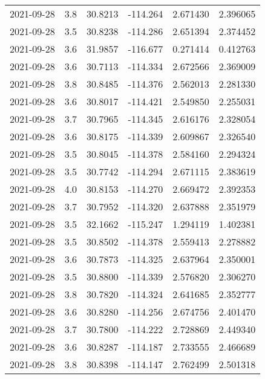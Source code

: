 \begin{tabular}{lrrrrr}
2021-09-28 &       3.8 &  30.8213 &  -114.264 &         2.671430 &         2.396065 \\
2021-09-28 &       3.5 &  30.8238 &  -114.286 &         2.651394 &         2.374452 \\
2021-09-28 &       3.6 &  31.9857 &  -116.677 &         0.271414 &         0.412763 \\
2021-09-28 &       3.6 &  30.7113 &  -114.334 &         2.672566 &         2.369009 \\
2021-09-28 &       3.8 &  30.8485 &  -114.376 &         2.562013 &         2.281330 \\
2021-09-28 &       3.6 &  30.8017 &  -114.421 &         2.549850 &         2.255031 \\
2021-09-28 &       3.7 &  30.7965 &  -114.345 &         2.616176 &         2.328054 \\
2021-09-28 &       3.6 &  30.8175 &  -114.339 &         2.609867 &         2.326540 \\
2021-09-28 &       3.5 &  30.8045 &  -114.378 &         2.584160 &         2.294324 \\
2021-09-28 &       3.5 &  30.7742 &  -114.294 &         2.671115 &         2.383619 \\
2021-09-28 &       4.0 &  30.8153 &  -114.270 &         2.669472 &         2.392353 \\
2021-09-28 &       3.7 &  30.7952 &  -114.320 &         2.637888 &         2.351979 \\
2021-09-28 &       3.5 &  32.1662 &  -115.247 &         1.294119 &         1.402381 \\
2021-09-28 &       3.5 &  30.8502 &  -114.378 &         2.559413 &         2.278882 \\
2021-09-28 &       3.6 &  30.7873 &  -114.325 &         2.637964 &         2.350001 \\
2021-09-28 &       3.5 &  30.8800 &  -114.339 &         2.576820 &         2.306270 \\
2021-09-28 &       3.8 &  30.7820 &  -114.324 &         2.641685 &         2.352777 \\
2021-09-28 &       3.6 &  30.8280 &  -114.256 &         2.674756 &         2.401470 \\
2021-09-28 &       3.7 &  30.7800 &  -114.222 &         2.728869 &         2.449340 \\
2021-09-28 &       3.6 &  30.8287 &  -114.187 &         2.733555 &         2.466689 \\
2021-09-28 &       3.8 &  30.8398 &  -114.147 &         2.762499 &         2.501318 \\

\end{tabular}
